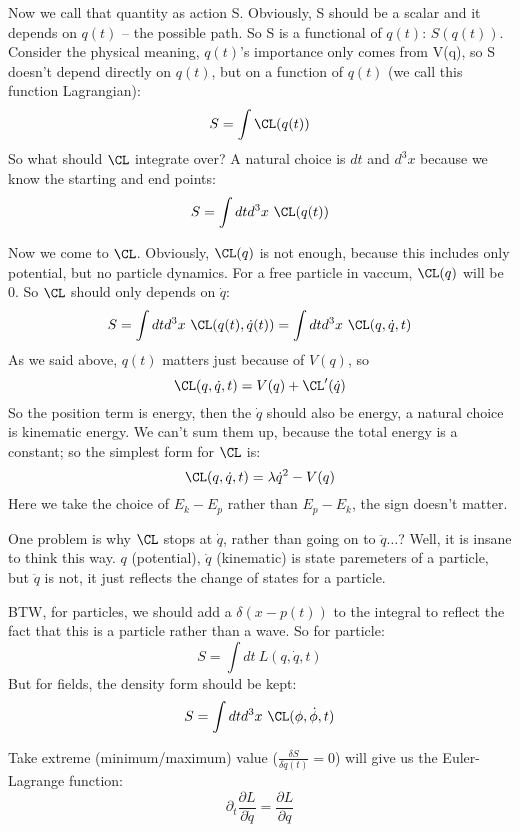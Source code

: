 Now we call that quantity as action S. Obviously, S should be a scalar and it
depends on $q(t)$ -- the possible path. So S is a functional of $q(t)$: $S(q(t))$. 
Consider the physical meaning, $q(t)$'s importance only comes from V(q), so S 
doesn't depend directly on $q(t)$, but on a function of $q(t)$ (we call this 
function Lagrangian):
$$ S = \int \CL(q(t)) $$
So what should $\CL$ integrate over? A natural choice is $dt$ and $d^3x$ because
we know the starting and end points:
$$ S = \int dtd^3x \  \CL(q(t)) $$

Now we come to $\CL$. Obviously, $\CL(q)$ is not enough, because this includes
only potential, but no particle dynamics. For a free particle in vaccum, $\CL(q)$
will be 0. So $\CL$ should only depends on $\dot{q}$:
$$ S = \int dtd^3x \ \CL(q(t), \dot{q}(t)) = \int dtd^3x \ \CL(q, \dot{q}, t) $$
As we said above, $q(t)$ matters just because of $V(q)$, so 
$$ \CL(q, \dot{q}, t) = V(q) + \CL'(\dot{q}) $$
So the position term is energy, then the $\dot{q}$ should also be energy, a 
natural choice is kinematic energy. We can't sum them up, because the total
energy is a constant; so the simplest form for $\CL$ is:
$$ \CL(q, \dot{q}, t) = \lambda \dot{q}^2 - V(q) $$
Here we take the choice of $E_k - E_p$ rather than $E_p - E_k$, the sign doesn't
matter.

One problem is why $\CL$ stops at $\dot{q}$, rather than going on to $\ddot{q} \dots$?
Well, it is insane to think this way. $q$ (potential), $\dot{q}$ (kinematic) is 
state paremeters of a particle, but $\ddot{q}$ is not, it just reflects the 
change of states for a particle.

BTW, for particles, we should add a $\delta(x-p(t))$ to the integral to reflect
the fact that this is a particle rather than a wave. So for particle:
$$ S = \int dt \ L(q, \dot{q}, t) $$
But for fields, the density form should be kept:
$$ S = \int dtd^3x \ \CL(\phi, \dot{\phi}, t) $$

Take extreme (minimum/maximum) value ($\frac{\delta S}{\delta q(t)} = 0$) will
give us the Euler-Lagrange function:
$$ \partial_t\frac{\partial L}{\partial \dot{q}} = \frac{\partial L}{\partial q}$$


